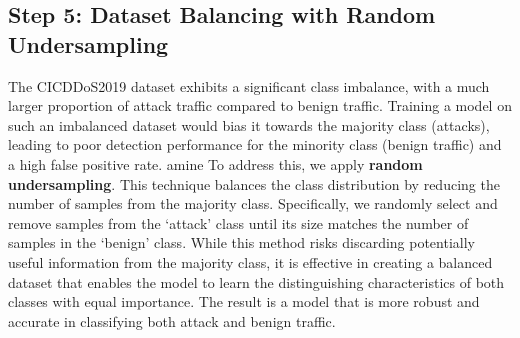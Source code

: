 \documentclass{report}
\begin{document}
\subsection{Step 5: Dataset Balancing with Random Undersampling}
The CICDDoS2019 dataset exhibits a significant class imbalance, with a much larger proportion of attack traffic compared to benign traffic. Training a model on such an imbalanced dataset would bias it towards the majority class (attacks), leading to poor detection performance for the minority class (benign traffic) and a high false positive rate.
amine
To address this, we apply \textbf{random undersampling}. This technique balances the class distribution by reducing the number of samples from the majority class. Specifically, we randomly select and remove samples from the `attack' class until its size matches the number of samples in the `benign' class. While this method risks discarding potentially useful information from the majority class, it is effective in creating a balanced dataset that enables the model to learn the distinguishing characteristics of both classes with equal importance. The result is a model that is more robust and accurate in classifying both attack and benign traffic.




\end{document}

